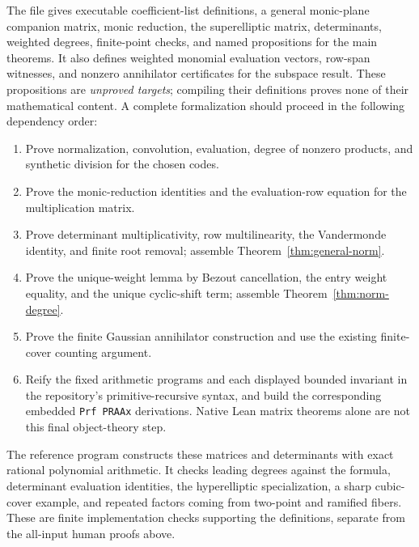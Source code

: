 The file  gives executable
coefficient-list definitions, a general monic-plane companion matrix,
monic reduction, the superelliptic matrix, determinants, weighted
degrees, finite-point checks, and named propositions for the main
theorems. It also defines weighted monomial evaluation vectors, row-span
witnesses, and nonzero annihilator certificates for the subspace result.
These propositions are
\emph{unproved targets}; compiling their definitions proves none
of their mathematical content. A complete formalization should
proceed in the following dependency order:
\begin{enumerate}
\item Prove normalization, convolution, evaluation, degree of
  nonzero products, and synthetic division for the chosen codes.
\item Prove the monic-reduction identities and the evaluation-row
  equation for the multiplication matrix.
\item Prove determinant multiplicativity, row multilinearity,
  the Vandermonde identity, and finite root removal; assemble
  Theorem~\ref{thm:general-norm}.
\item Prove the unique-weight lemma by Bezout cancellation,
  the entry weight equality, and the unique cyclic-shift term;
  assemble Theorem~\ref{thm:norm-degree}.
\item Prove the finite Gaussian annihilator construction and
  use the existing finite-cover counting argument.
\item Reify the fixed arithmetic programs and each displayed
  bounded invariant in the repository's primitive-recursive
  syntax, and build the corresponding embedded
  \texttt{Prf PRAAx} derivations. Native Lean matrix theorems alone
  are not this final object-theory step.
\end{enumerate}

The reference program 
constructs these matrices and determinants with exact rational
polynomial arithmetic. It checks leading degrees against the
formula, determinant evaluation identities, the hyperelliptic
specialization, a sharp cubic-cover example, and repeated factors
coming from two-point and ramified fibers. These are finite
implementation checks supporting the definitions, separate from
the all-input human proofs above.

